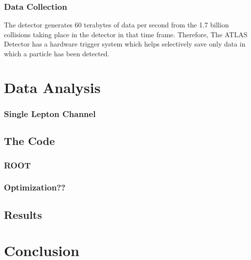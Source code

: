 \documentclass[11pt,a4paper]{article}
\begin{document}
\subsubsection{Data Collection}
The detector generates 60 terabytes of data per second from the 1.7 billion
collisions taking place in the detector in that time frame. Therefore, The ATLAS
Detector has a hardware trigger system which helps selectively save only data in
which a particle has been detected.


\section{Data Analysis}

\subsubsection{Single Lepton Channel}

\subsection{The Code}

\subsubsection{ROOT}

\subsubsection{Optimization??}

\subsection{Results}

\section{Conclusion}

\printbibliography
\end{document}
